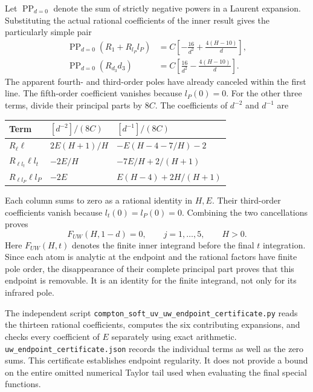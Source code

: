 Let $\operatorname{PP}_{d=0}$ denote the sum of strictly negative powers
in a Laurent expansion.  Substituting the actual rational coefficients
of the inner result gives the particularly simple pair
\begin{align}
 \operatorname{PP}_{d=0}(R_1+R_{l_P}l_P)
 &=C\left[-\frac{16}{d^2}+\frac{4(H-10)}d\right],\\
 \operatorname{PP}_{d=0}(R_{d_3}d_3)
 &=C\left[\frac{16}{d^2}-\frac{4(H-10)}d\right].
\end{align}
The apparent fourth- and third-order poles have already canceled within
the first line.  The fifth-order coefficient vanishes because $l_P(0)=0$.
For the other three terms, divide their principal parts by $8C$.
The coefficients of $d^{-2}$ and $d^{-1}$ are
\begin{center}
\begin{tabular}{lll}
\toprule
Term & $[d^{-2}]/(8C)$ & $[d^{-1}]/(8C)$\\
\midrule
$R_\ell\ell$ & $2E(H+1)/H$ & $-E(H-4-7/H)-2$\\
$R_{\ell l_t}\ell l_t$ & $-2E/H$ & $-7E/H+2/(H+1)$\\
$R_{\ell l_P}\ell l_P$ & $-2E$ & $E(H-4)+2H/(H+1)$\\
\bottomrule
\end{tabular}
\end{center}
Each column sums to zero as a rational identity in $H,E$.  Their
third-order coefficients vanish because $l_t(0)=l_P(0)=0$.
Combining the two cancellations proves
\begin{equation}
 [d^{-j}]F_{UW}(H,1-d)=0,\qquad j=1,\ldots,5,\qquad H>0.
\end{equation}
Here $F_{UW}(H,t)$ denotes the finite inner integrand before the final
$t$ integration.  Since each atom is analytic at the endpoint and the
rational factors have finite pole order, the disappearance of their
complete principal part proves that this endpoint is removable.
It is an identity for the finite integrand, not only for its infrared pole.

The independent script
\nolinkurl{compton_soft_uv_uw_endpoint_certificate.py} reads the thirteen
rational coefficients, computes the six contributing expansions, and
checks every coefficient of $E$ separately using exact arithmetic.
\nolinkurl{uw_endpoint_certificate.json} records the individual terms
as well as the zero sums.  This certificate establishes endpoint
regularity.  It does not provide a bound on the entire omitted numerical
Taylor tail used when evaluating the final special functions.

